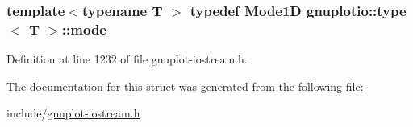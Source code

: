 \subsubsection[{\texorpdfstring{mode}{mode}}]{\setlength{\rightskip}{0pt plus 5cm}template$<$typename T $>$ typedef {\bf Mode1D} gnuplotio\+::type$<$ T $>$\+::{\bf mode}}\hypertarget{structgnuplotio_1_1_mode_auto_decoder_3_01_t_00_01typename_01boost_1_1enable__if__c_3_01_07_arraea646779afc1e35efaeffcebe81e18a0_a17dc2e2ec9d21833a8bd6f1a67e32e48}{}\label{structgnuplotio_1_1_mode_auto_decoder_3_01_t_00_01typename_01boost_1_1enable__if__c_3_01_07_arraea646779afc1e35efaeffcebe81e18a0_a17dc2e2ec9d21833a8bd6f1a67e32e48}


Definition at line 1232 of file gnuplot-\/iostream.\+h.



The documentation for this struct was generated from the following file\+:\begin{DoxyCompactItemize}
\item 
include/\hyperlink{gnuplot-iostream_8h}{gnuplot-\/iostream.\+h}\end{DoxyCompactItemize}
